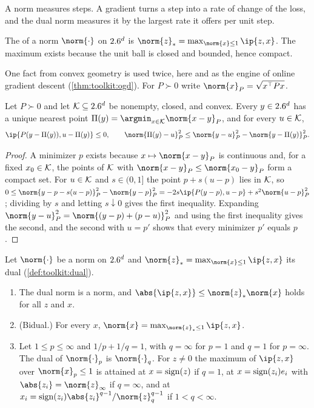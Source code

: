 \begin{refsection}
A norm measures steps. A gradient turns a step into a rate of change of the loss, and the dual norm measures it by the largest rate it offers per unit step.

\begin{definition}\label{def:toolkit:dual}
The  of a norm $\norm{\cdot}$ on $2.6^d$ is $\norm{z}_*=\max_{\norm{x}\le1}\ip{z,x}$. The maximum exists because the unit ball is closed and bounded, hence compact.
\end{definition}

One fact from convex geometry is used twice, here and as the engine of online gradient descent (\cref{thm:toolkit:ogd}). For $P\succ0$ write $\norm{x}_P=\sqrt{x^\top Px}$.

\begin{lemma}\label{lem:toolkit:projection}
Let $P\succ0$ and let $\mathcal{K}\subseteq2.6^d$ be nonempty, closed, and convex. Every $y\in2.6^d$ has a unique nearest point $\Pi(y)=\argmin_{x\in\cK}\norm{x-y}_P$, and for every $u\in\mathcal{K}$,
\[
  \ip{P(y-\Pi(y)),u-\Pi(y)}\le0,\qquad\norm{\Pi(y)-u}_P^2\le\norm{y-u}_P^2-\norm{y-\Pi(y)}_P^2 .
\]
\end{lemma}

\begin{proof}
A minimizer $p$ exists because $x\mapsto\norm{x-y}_P$ is continuous and, for a fixed $x_0\in\mathcal{K}$, the points of $\mathcal{K}$ with $\norm{x-y}_P\le\norm{x_0-y}_P$ form a compact set. For $u\in\mathcal{K}$ and $s\in(0,1]$ the point $p+s(u-p)$ lies in $\mathcal{K}$, so $0\le\norm{y-p-s(u-p)}_P^2-\norm{y-p}_P^2=-2s\ip{P(y-p),u-p}+s^2\norm{u-p}_P^2$; dividing by $s$ and letting $s\downarrow0$ gives the first inequality. Expanding $\norm{y-u}_P^2=\norm{(y-p)+(p-u)}_P^2$ and using the first inequality gives the second, and the second with $u=p'$ shows that every minimizer $p'$ equals $p$.
\end{proof}

\begin{lemma}\label{lem:toolkit:dualnorm}
Let $\norm{\cdot}$ be a norm on $2.6^d$ and $\norm{z}_*=\max_{\norm{x}\le1}\ip{z,x}$ its dual (\cref{def:toolkit:dual}).
\begin{enumerate}
\item The dual norm is a norm, and  $\abs{\ip{z,x}}\le\norm{z}_*\norm{x}$ holds for all $z$ and $x$.
\item (Bidual.) For every $x$, $\norm{x}=\max_{\norm{z}_*\le1}\ip{z,x}$.
\item Let $1\le p\le\infty$ and $1/p+1/q=1$, with $q=\infty$ for $p=1$ and $q=1$ for $p=\infty$. The dual of $\norm{\cdot}_p$ is $\norm{\cdot}_q$. For $z\ne0$ the maximum of $\ip{z,x}$ over $\norm{x}_p\le1$ is attained at $x=\operatorname{sign}(z)$ if $q=1$, at $x=\operatorname{sign}(z_i)e_i$ with $\abs{z_i}=\norm{z}_\infty$ if $q=\infty$, and at $x_i=\sign(z_i)\abs{z_i}^{q-1}/\norm{z}_q^{q-1}$ if $1<q<\infty$.
\end{enumerate}
\end{lemma}


\end{refsection}
